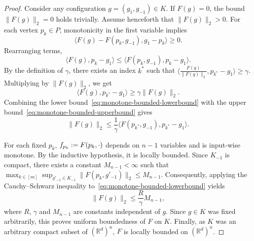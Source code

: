 \documentclass[twoside,11pt]{article}
\newcommand{\R}{\mathbb{R}}
\begin{document}
\begin{proof}
Consider any configuration $g = (g_1, g_{-1}) \in K$. 
If $F(g) = 0$, the bound $\|F(g)\|_2 = 0$ holds trivially. 
Assume henceforth that $\|F(g)\|_2 > 0$.
For each vertex $p_k \in P$, monotonicity in the first variable implies
\[ 
  \langle F(g) - F(p_k, g_{-1}), g_1 - p_k \rangle \geq 0. 
\]
Rearranging terms,
\begin{equation}\label{eq:monotone-bounded-upperbound}
  \langle F(g), p_k - g_1 \rangle \leq \langle F(p_k, g_{-1}), p_k - g_1 \rangle. 
\end{equation}
By the definition of $\gamma$, there exists an index $k^*$ such that $\langle \frac{F(g)}{\|F(g)\|_2}, p_{k^*} - g_1 \rangle \geq \gamma$. 
Multiplying by $\|F(g)\|_2$, we get
\begin{equation}\label{eq:monotone-bounded-lowerbound}
    \langle F(g), p_{k^*} - g_1 \rangle \geq \gamma \|F(g)\|_2.
\end{equation}
Combining the lower bound~\ref{eq:monotone-bounded-lowerbound} with the upper bound~\ref{eq:monotone-bounded-upperbound} gives
\begin{equation}\label{eq:monotone-bounded-combined}
    \|F(g)\|_2 \leq \frac{1}{\gamma} \langle F(p_{k^*}, g_{-1}), p_{k^*} - g_1 \rangle.
\end{equation}

For each fixed $p_k$, $f_{p_{k}} \vcentcolon= F(p_{k}, \cdot)$ depends on $n-1$ variables and is input-wise monotone. 
By the inductive hypothesis, it is locally bounded. 
Since $K_{-1}$ is compact, there exists a constant $M_{n-1} < \infty$ such that $\max_{k\in[m]}\sup_{g'_{-1} \in K_{-1}} \|F(p_k, g'_{-1})\|_2 \leq M_{n-1}$.
Consequently, applying the Cauchy–Schwarz inequality to~\eqref{eq:monotone-bounded-lowerbound} yields
\[
  \|F(g)\|_2 \leq \frac{R}{\gamma} M_{n-1},
\]
where $R$, $\gamma$ and $M_{n-1}$ are constants independent of $g$. 
Since $g \in K$ was fixed arbitrarily, this proves uniform boundedness of $F$ on $K$. 
Finally, as $K$ was an arbitrary compact subset of $(\R^d)^n$, $F$ is locally bounded on $(\R^d)^n$.
\end{proof}
\end{document}
